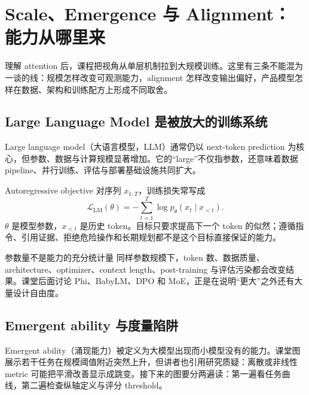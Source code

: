 \section{Scale、Emergence 与 Alignment：能力从哪里来}

理解 attention 后，课程把视角从单层机制拉到大规模训练。这里有三条不能混为一谈的线：规模怎样改变可观测能力，alignment 怎样改变输出偏好，产品模型怎样在数据、架构和训练配方上形成不同取舍。

\subsection{Large Language Model 是被放大的训练系统}

Large language model（大语言模型，LLM）通常仍以 next-token prediction 为核心，但参数、数据与计算规模显著增加。它的“large”不仅指参数，还意味着数据 pipeline、并行训练、评估与部署基础设施共同扩大。


\begin{importantbox}{Autoregressive objective}
对序列 $x_{1:T}$，训练损失常写成
\[
\mathcal{L}_{\mathrm{LM}}(\theta)=-\sum_{t=1}^{T}\log p_{\theta}(x_t\mid x_{<t}).
\]
$\theta$ 是模型参数，$x_{<t}$ 是历史 token。目标只要求提高下一个 token 的似然；遵循指令、引用证据、拒绝危险操作和长期规划都不是这个目标直接保证的能力。
\end{importantbox}

\begin{warningbox}{参数量不是能力的充分统计量}
同样参数规模下，token 数、数据质量、architecture、optimizer、context length、post-training 与评估污染都会改变结果。课堂后面讨论 Phi、BabyLM、DPO 和 MoE，正是在说明“更大”之外还有大量设计自由度。
\end{warningbox}

\subsection{Emergent ability 与度量陷阱}

Emergent ability（涌现能力）被定义为大模型出现而小模型没有的能力。课堂图展示若干任务在规模阈值附近突然上升，但讲者也引用研究质疑：离散或非线性 metric 可能把平滑改善显示成跳变。接下来的图要分两遍读：第一遍看任务曲线，第二遍检查纵轴定义与评分 threshold。


